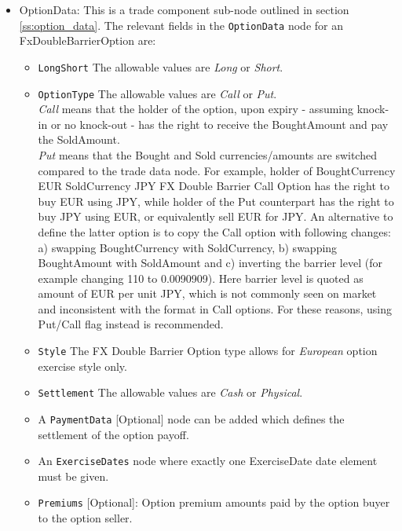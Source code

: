 \begin{itemize}


\item OptionData: This is a trade component sub-node outlined in section \ref{ss:option_data}. 
The relevant fields in the \lstinline!OptionData! node for an FxDoubleBarrierOption are:

\begin{itemize}
\item \lstinline!LongShort! The allowable values are \emph{Long} or \emph{Short}.

\item \lstinline!OptionType! The allowable values are \emph{Call} or \emph{Put}. \\
 \emph{Call} means that the holder of the option, upon expiry - assuming knock-in or no knock-out - has the right to receive the BoughtAmount and pay the SoldAmount. \\\emph{Put} means that the Bought and Sold currencies/amounts are switched compared to the trade data node. 
For example, holder of BoughtCurrency EUR SoldCurrency JPY FX Double Barrier Call Option has the right to buy EUR using JPY, while
holder of the Put counterpart has the right to buy JPY using EUR, or equivalently sell EUR for JPY. An alternative to define the latter option is to copy the Call option with following changes:\\
a) swapping BoughtCurrency with SoldCurrency, b) swapping BoughtAmount with SoldAmount and c) inverting the barrier level (for example changing 110 to 0.0090909). Here barrier level is
quoted as amount of EUR per unit JPY, which is not commonly seen on market and inconsistent with the format in Call options. For these reasons, using Put/Call flag instead is recommended.

\item  \lstinline!Style! The FX Double Barrier Option type allows for \emph{European} option exercise style only.

\item  \lstinline!Settlement! The allowable values are \emph{Cash} or \emph{Physical}.

\item A \lstinline!PaymentData! [Optional] node can be added which defines the settlement of the option payoff.

\item An \lstinline!ExerciseDates! node where exactly one ExerciseDate date element must be given.

\item \lstinline!Premiums! [Optional]: Option premium amounts paid by the option buyer to the option seller.


\end{itemize}
\end{itemize}
